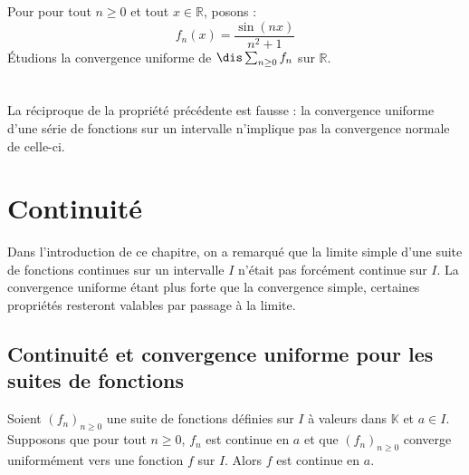 \documentclass[a4paper,10pt]{report}
\begin{document}
\begin{ex} Pour pour tout $n \geq 0$ et tout $x \in \mathbb{R}$, posons :
$$ f_n(x) = \frac{\sin(nx)}{n^2+1}$$
Étudions la convergence uniforme de $\dis \sum_{n \geq 0} f_n$ sur $\mathbb{R}$.

\newpage
$\phantom{test}$
\medskip
%

\vspace{7cm}
\end{ex}

\begin{rem} La réciproque de la propriété précédente est fausse : la convergence uniforme d'une série de fonctions sur un intervalle n'implique pas la convergence normale de celle-ci.
\end{rem}

\section{Continuité}

\noindent Dans l'introduction de ce chapitre, on a remarqué que la limite simple d'une suite de fonctions continues sur un intervalle $I$ n'était pas forcément continue sur $I$. La convergence uniforme étant plus \og forte \fg que la convergence simple, certaines propriétés resteront valables par passage à la limite.

\subsection{Continuité et convergence uniforme pour les suites de fonctions}

\begin{thm}\label{segment}
Soient $(f_n)_{n \geq 0}$ une suite de fonctions définies sur $I$ à valeurs dans $\mathbb{K}$ et $a \in I$. Supposons que pour tout $n \geq 0$, $f_n$ est continue en $a$ et que $(f_n)_{n \geq 0}$ converge uniformément vers une fonction $f$ sur $I$. Alors $f$ est continue en $a$.
\end{thm}
\end{document}
